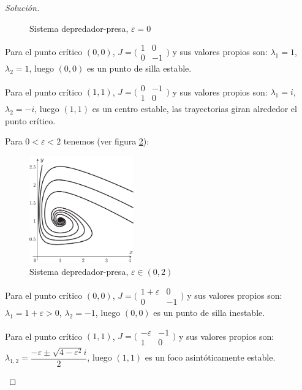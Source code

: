 \documentclass[a5paper,doc,10pt,noapacite]{apa6}
\begin{document}
{{\begin{proof}[Solución]
\begin{figure}[H]
		\caption{Sistema depredador-presa, \(\varepsilon=0\)}
		\label{fig:M-23}
	\end{figure}
	
	\begin{APAenumerate}
			\item Para el punto crítico \((0,0)\), \(J= \Big(\begin{smallmatrix} 1 & 0 \\ 0 & -1\end{smallmatrix} \Big)\) y sus valores propios son: \(\lambda_1=1\), \(\lambda_2=1\), luego \((0,0)\) es un punto de silla estable.
			\item Para el punto crítico \((1,1)\), \(J= \Big(\begin{smallmatrix} 0 & -1 \\ 1 & 0 \end{smallmatrix}\Big) \) y sus valores propios son: \(\lambda_1=i\), \(\lambda_2=-i\), luego \((1,1)\) es un centro estable, las trayectorias giran alrededor el punto crítico.
		\end{APAenumerate}
	
	\vspace{1\baselineskip}
	Para \(0<\varepsilon<2\) tenemos (ver figura \ref{fig:M-24}):
	\begin{figure}[H]
		\captionsetup{justification=centering, labelfont=footnotesize, font=footnotesize}
		\centering
		\includegraphics[width=4.5cm]{Graficos/figura24}
	
		\caption{Sistema depredador-presa, \(\varepsilon \in (0,2)\)}
		\label{fig:M-24}
	\end{figure}

	\begin{APAenumerate}
		\item Para el punto crítico \((0,0)\), \(J= \Big(\begin{smallmatrix}  1+\varepsilon & 0 \\ 0 & -1 \end{smallmatrix} \Big) \) y sus valores propios son: \(\lambda_1=1+\varepsilon>0\), \(\lambda_2=-1\), luego \((0,0)\) es un punto de silla inestable.
		\item Para el punto crítico \((1,1)\), \(J= \Big(\begin{smallmatrix}  -\varepsilon & -1 \\ 1 & 0\end{smallmatrix} \Big) \) y sus valores propios son: \(\lambda_{1,2}=\dfrac{-\varepsilon\pm\sqrt{4-\varepsilon^2}i}{2}\), luego \((1,1)\) es un foco asintóticamente estable.
	\end{APAenumerate}


\end{proof}}}
\end{document}
